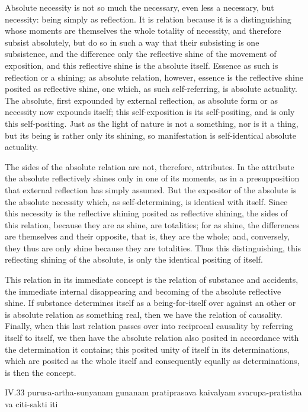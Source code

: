 Absolute necessity is not so much the necessary,
even less a necessary, but necessity:
being simply as reflection.
It is relation because it is a distinguishing
whose moments are themselves
the whole totality of necessity,
and therefore subsist absolutely,
but do so in such a way that
their subsisting is one subsistence,
and the difference only the reflective shine of
the movement of exposition,
and this reflective shine is the absolute itself.
Essence as such is reflection or a shining;
as absolute relation, however, essence is the
reflective shine posited as reflective shine,
one which, as such self-referring, is absolute actuality.
The absolute, first expounded by external reflection,
as absolute form or as necessity now expounds itself;
this self-exposition is its self-positing,
and is only this self-positing.
Just as the light of nature is not a something,
nor is it a thing, but its being is rather only its shining,
so manifestation is self-identical absolute actuality.

The sides of the absolute relation
are not, therefore, attributes.
In the attribute the absolute reflectively shines
only in one of its moments,
as in a presupposition that
external reflection has simply assumed.
But the expositor of the absolute is the absolute necessity
which, as self-determining, is identical with itself.
Since this necessity is the reflective shining
posited as reflective shining, the sides of this relation,
because they are as shine, are totalities;
for as shine, the differences are
themselves and their opposite,
that is, they are the whole;
and, conversely, they thus are only shine
because they are totalities.
Thus this distinguishing,
this reflecting shining of the absolute,
is only the identical positing of itself.

This relation in its immediate concept is
the relation of substance and accidents,
the immediate internal disappearing and becoming
of the absolute reflective shine.
If substance determines itself as a being-for-itself over
against an other or is absolute relation as something real,
then we have the relation of causality.
Finally, when this last relation passes over into
reciprocal causality by referring itself to itself,
we then have the absolute relation also posited
in accordance with the determination it contains;
this posited unity of itself in its determinations,
which are posited as the whole itself
and consequently equally as determinations,
is then the concept.

IV.33
purusa-artha-sunyanam gunanam pratiprasava kaivalyam
svarupa-pratistha va citi-sakti iti

